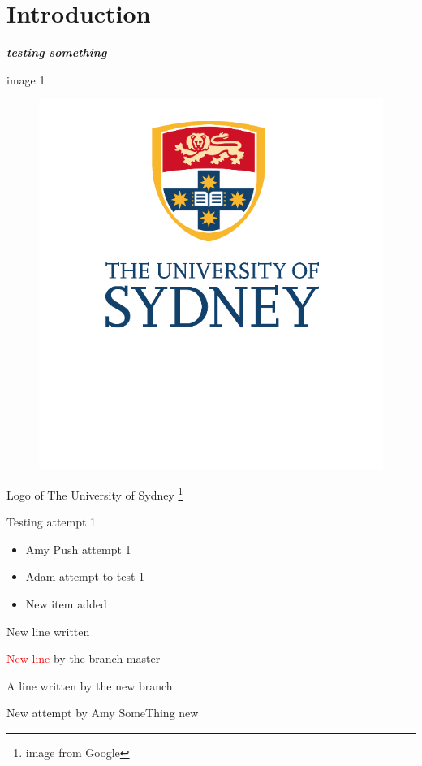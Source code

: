 \documentclass[10pt]{article}
\newcommand{\boldit}[1]{\textbf{\textit{#1}}}
\begin{document}
\section{\textsf{Introduction}}
\boldit{testing something}

image 1 
\begin{figure}[hbt!]
  \centering
  \includegraphics{usyd}
\end{figure}

Logo of The University of Sydney \footnote{image from Google}

Testing attempt 1
\begin{itemize}
  \item Amy Push attempt 1
  \item Adam attempt to test 1
  \item New item added
\end{itemize}
New line written

\textcolor{red}{New line} by the branch master


A line written by the new branch

New attempt by Amy
SomeThing new
\end{document}
